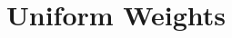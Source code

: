 \documentclass[final,5p,times,twocolumn]{elsarticle}
\begin{document}




\section{Uniform Weights}
\end{document}
